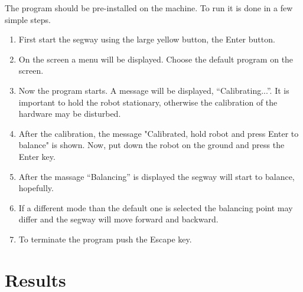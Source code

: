 \documentclass[a4paper]{article}
\begin{document}
The program should be pre-installed on the machine. To run it is done in a few simple steps.

\begin{enumerate}
\item First start the segway using the large yellow button, the Enter button.
\item On the screen a menu will be displayed. Choose the default program on the screen.
\item Now the program starts. A message will be displayed, “Calibrating...”. It is important to hold the robot stationary, otherwise the calibration of the hardware may be disturbed.
\item After the calibration, the message "Calibrated, hold robot and press Enter to balance" is shown. Now, put down the robot on the ground and press the Enter key.
\item After the massage “Balancing” is displayed the segway will start to balance, hopefully.
\item If a different mode than the default one is selected the balancing point may differ and the segway will move forward and backward.
\item To terminate the program push the Escape key.
\end{enumerate}

\section{Results}
\end{document}
